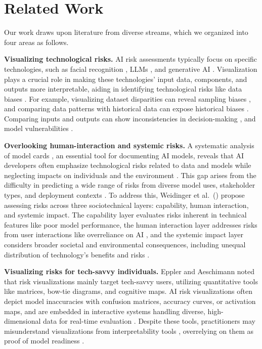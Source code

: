 \section{Related Work}
\label{sec:related}

Our work draws upon literature from diverse streams, which we organized into four areas as follows.

\smallskip
\noindent\textbf{Visualizing technological risks.} AI risk assessments typically focus on specific technologies, such as facial recognition \cite{moraes2021smile}, LLMs \cite{weidinger2021ethicalsocialrisks}, and generative AI \cite{barrett2023identifying}. Visualization plays a crucial role in making these technologies' input data, components, and outputs more interpretable, aiding in identifying technological risks like data biases \cite{vis4ml_review2024,inel2023collect}. For example, visualizing dataset disparities can reveal sampling biases \cite{aif360-oct-2018}, and comparing data patterns with historical data can expose historical biases \cite{IBMriskAtlas}. Comparing inputs and outputs can show inconsistencies in decision-making \cite{whatAILearns2023}, and model vulnerabilities \cite{perturber2021}. 

\smallskip
\noindent\textbf{Overlooking human-interaction and systemic risks.} 
A systematic analysis of model cards \cite{mitchell2019model}, an essential tool for documenting AI models, reveals that AI developers often emphasize technological risks related to data and models while neglecting impacts on individuals and the environment \cite{liang2024s}. This gap arises from the difficulty in predicting a wide range of risks from diverse model uses, stakeholder types, and deployment contexts \cite{boyarskaya2020overcoming, buccinca2023aha}. To address this, Weidinger et al.\ (\citeyear{weidinger2023sociotechnical}) propose assessing risks across three sociotechnical layers: capability, human interaction, and systemic impact. The capability layer evaluates risks inherent in technical features like poor model performance, the human interaction layer addresses risks from user interactions like overreliance on AI \cite{boyarskaya2020overcoming}, and the systemic impact layer considers broader societal and environmental consequences, including unequal distribution of technology's benefits and risks \cite{aif360-oct-2018}.

\smallskip
\noindent\textbf{Visualizing risks for tech-savvy individuals.} Eppler and Aeschimann \cite{Eppler2009} noted that risk visualizations mainly target tech-savvy users, utilizing quantitative tools like matrices, bow-tie diagrams, and cognitive maps. AI risk visualizations often depict model inaccuracies with confusion matrices, accuracy curves, or activation maps, and are embedded in interactive systems handling diverse, high-dimensional data for real-time evaluation \cite{shergadwala2022human,vis4ml_review2024, kwon2022rmexplorer,johnson2023does}. Despite these tools, practitioners may misunderstand visualizations from interpretability tools \cite{interpret_ml, lundberg2017unified}, overrelying on them as proof of model readiness \cite{kaur2020interpreting}. 

